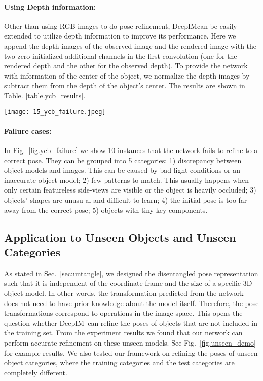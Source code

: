 \documentclass[twocolumn]{svjour3}
\newcommand{\dimnet}[0]{DeepIM}
\newcommand{\yi}[1]{#1}
\begin{document}
\paragraph{Using Depth information:} Other than using RGB images to do pose refinement, \dimnet can be easily extended to utilize depth information to improve its performance. Here we append the depth images of the observed image and the rendered image with the two zero-initialized additional channels in the first convolution (one for the rendered depth and the other for the observed depth). To provide the network with information of the center of the object, we normalize the depth images by
subtract them from
the depth of the object's center. The results are shown in Table. \ref{table.ycb_results}.
\begin{figure*}[t]
	\centering
	\texttt{[image: 15\_ycb\_failure.jpeg]}
\caption{Failure cases in YCB-Video dataset. \yi{These images illustrate 5 different reasons we concluded that leads to fail cases.}}
\label{fig.ycb_failure}
\end{figure*}

\paragraph{Failure cases:}
In Fig.~\ref{fig.ycb_failure} we show 10 instances that the network fails to refine to a correct pose. They can be grouped into 5 categories: \yi{1) discrepancy between object models and images.
This can be caused by bad light conditions
 or an inaccurate object model; 2) few patterns to match.
This 
usually happens when only certain featureless side-views are visible or the object is heavily
occluded;
3) objects' shapes are unusu    al and difficult to learn; 4) the initial pose is too far away from the correct pose; 5) objects with tiny key components.}


\subsection{Application to Unseen Objects and Unseen Categories}

As stated in Sec.~\ref{sec:untangle}, we designed the disentangled pose representation such that it is independent of the coordinate frame and the size of a specific 3D object model. In other words, the transformation predicted from the network does not need to have prior knowledge about the model itself. Therefore, the pose transformations correspond to operations in the image space. This opens the question whether \dimnet\ can refine the poses of objects that are not included in the training set. From the experiment results we found that our network can perform accurate refinement on these unseen models. See Fig.~\ref{fig.unseen_demo} for example results. We also tested our framework on refining the poses of unseen object categories, where the training categories and the test categories are completely different. 
\end{document}
